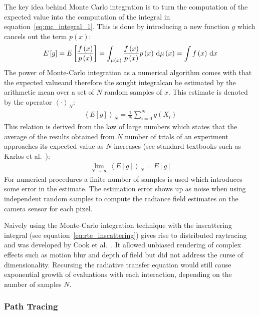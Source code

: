 The key idea behind Monte Carlo integration is to turn the computation of the expected value into the computation of the integral in equation~\ref{eq:mc_integral_1}. This is done by introducing a new function $g$ which cancels out the term $p\left(x\right)$:
\begin{align}
E\left[g\right]
=E\left[\frac{f\left(x\right)}{p\left(x\right)}\right]
= \int_{\mu\left(x\right)} \frac{f\left(x\right)}{p\left(x\right)}p\left(x\right)\,\mathrm{d}\mu\left(x\right)
=\int f\left(x\right)\,\mathrm{d} x
\end{align}
The power of Monte-Carlo integration as a numerical algorithm comes with that the expected value\mydash and therefore the sought integral\mydash can be estimated by the arithmetic mean over a set of $N$ random samples of $x$. This estimate is denoted by the operator $\left<\cdot\right>_N$:
\begin{align}
\left<E[g]\right>_N = 
\frac{1}{N}\sum_{i=0}^{N}
g\left(X_i\right)
\end{align}
This relation is derived from the law of large numbers which states that the average of the results obtained from $N$ number of trials of an experiment approaches its expected value as $N$ increases (see standard textbooks such as Karlos et al.~\cite{Kalos86}):
\begin{align}
\lim_{N\rightarrow\infty} \left<E[g]\right>_N = E[g]
\end{align}
For numerical procedures a finite number of samples is used which introduces some error in the estimate. The estimation error shows up as noise when using independent random samples to compute the radiance field estimates on the camera sensor for each pixel.

Naively using the Monte-Carlo integration technique with the inscattering integral (see equation~\ref{eq:rte_inscattering}) gives rise to distributed raytracing and was developed by Cook et al.~\cite{Cook84}. It allowed unbiased rendering of complex effects such as motion blur and depth of field but did not address the curse of dimensionality. Recursing the radiative transfer equation would still cause exponential growth of evaluations with each interaction, depending on the number of samples $N$.


\subsubsection*{Path Tracing}

